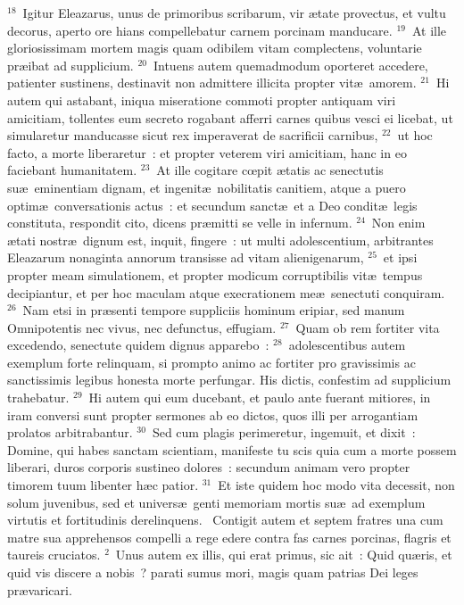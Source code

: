 ${}^{18}$~Igitur Eleazarus, unus de primoribus scribarum, vir \ae tate provectus, et vultu decorus, aperto ore hians compellebatur carnem porcinam manducare.
${}^{19}$~At ille gloriosissimam mortem magis quam odibilem vitam complectens, voluntarie pr\ae ibat ad supplicium.
${}^{20}$~Intuens autem quemadmodum oporteret accedere, patienter sustinens, destinavit non admittere illicita propter vit\ae\ amorem.
${}^{21}$~Hi autem qui astabant, iniqua miseratione commoti propter antiquam viri amicitiam, tollentes eum secreto rogabant afferri carnes quibus vesci ei licebat, ut simularetur manducasse sicut rex imperaverat de sacrificii carnibus,
${}^{22}$~ut hoc facto, a morte liberaretur~: et propter veterem viri amicitiam, hanc in eo faciebant humanitatem.
${}^{23}$~At ille cogitare cœpit \ae tatis ac senectutis su\ae\ eminentiam dignam, et ingenit\ae\ nobilitatis canitiem, atque a puero optim\ae\ conversationis actus~: et secundum sanct\ae\ et a Deo condit\ae\ legis constituta, respondit cito, dicens pr\ae mitti se velle in infernum.
${}^{24}$~Non enim \ae tati nostr\ae\ dignum est, inquit, fingere~: ut multi adolescentium, arbitrantes Eleazarum nonaginta annorum transisse ad vitam alienigenarum,
${}^{25}$~et ipsi propter meam simulationem, et propter modicum corruptibilis vit\ae\ tempus decipiantur, et per hoc maculam atque execrationem me\ae\ senectuti conquiram.
${}^{26}$~Nam etsi in pr\ae senti tempore suppliciis hominum eripiar, sed manum Omnipotentis nec vivus, nec defunctus, effugiam.
${}^{27}$~Quam ob rem fortiter vita excedendo, senectute quidem dignus apparebo~:
${}^{28}$~adolescentibus autem exemplum forte relinquam, si prompto animo ac fortiter pro gravissimis ac sanctissimis legibus honesta morte perfungar. His dictis, confestim ad supplicium trahebatur.
${}^{29}$~Hi autem qui eum ducebant, et paulo ante fuerant mitiores, in iram conversi sunt propter sermones ab eo dictos, quos illi per arrogantiam prolatos arbitrabantur.
${}^{30}$~Sed cum plagis perimeretur, ingemuit, et dixit~: Domine, qui habes sanctam scientiam, manifeste tu scis quia cum a morte possem liberari, duros corporis sustineo dolores~: secundum animam vero propter timorem tuum libenter h\ae c patior.
${}^{31}$~Et iste quidem hoc modo vita decessit, non solum juvenibus, sed et univers\ae\ genti memoriam mortis su\ae\ ad exemplum virtutis et fortitudinis derelinquens.
~Contigit autem et septem fratres una cum matre sua apprehensos compelli a rege edere contra fas carnes porcinas, flagris et taureis cruciatos.
${}^{2}$~Unus autem ex illis, qui erat primus, sic ait~: Quid qu\ae ris, et quid vis discere a nobis~? parati sumus mori, magis quam patrias Dei leges pr\ae varicari.

